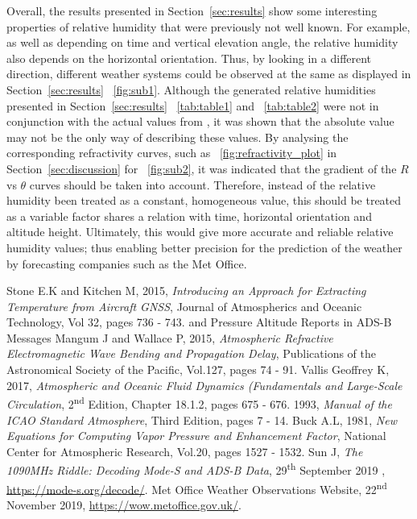 \documentclass{article}
\newcommand{\figref}[2][\figurename~]{#1\ref{#2}}
\newcommand{\tabref}[2][\tablename~]{#1\ref{#2}}
\newcommand{\secref}[2][Section~]{#1\ref{#2}}
\begin{document}
Overall, the results presented in \secref{sec:results} show some interesting properties of relative humidity that were previously not well known. For example, as well as depending on time and vertical elevation angle, the relative humidity also depends on the horizontal orientation. Thus, by looking in a different direction, different weather systems could be observed at the same as displayed in \secref{sec:results} \figref{fig:sub1}. Although the generated relative humidities presented in \secref{sec:results} \tabref{tab:table1} and \tabref{tab:table2} were not in conjunction with the actual values from \cite{Web01}, it was shown that the absolute value may not be the only way of describing these values. By analysing the corresponding refractivity curves, such as \figref{fig:refractivity_plot} in \secref{sec:discussion} for \figref{fig:sub2}, it was indicated that the gradient of the $R$ vs $\theta$ curves should be taken into account. Therefore, instead of the relative humidity been treated as a constant, homogeneous value, this should be treated as a variable factor shares a relation with time, horizontal orientation and altitude height. Ultimately, this would give more accurate and reliable relative humidity values; thus enabling better precision for the prediction of the weather by forecasting companies such as the Met Office.


\begin{thebibliography}{9}
 Stone E.K and Kitchen M, 2015, \textit{Introducing an Approach for Extracting Temperature from Aircraft GNSS}, Journal of Atmospherics and Oceanic Technology, Vol 32, pages 736 - 743. 
and Pressure Altitude Reports in ADS-B Messages
 Mangum J and Wallace P, 2015, \textit{Atmospheric Refractive Electromagnetic Wave Bending and Propagation Delay}, Publications of the Astronomical Society of the Pacific, Vol.127, pages 74 - 91.
 Vallis Geoffrey K, 2017, \textit{Atmospheric and Oceanic Fluid Dynamics (Fundamentals and Large-Scale Circulation}, 2\textsuperscript{nd} Edition, Chapter 18.1.2, pages 675 - 676.
 1993, \textit{Manual of the ICAO Standard Atmosphere}, Third Edition, pages 7 - 14.
 Buck A.L, 1981, \textit{New Equations for Computing Vapor Pressure and Enhancement Factor}, National Center for Atmospheric Research, Vol.20, pages 1527 - 1532.
 Sun J, \textit{The 1090MHz Riddle: Decoding Mode-S and ADS-B Data}, 29\textsuperscript{th} September 2019 , \url{https://mode-s.org/decode/}.  
 Met Office Weather Observations Website, 22\textsuperscript{nd} November 2019,  \url{https://wow.metoffice.gov.uk/}.


\end{thebibliography}
\end{document}
